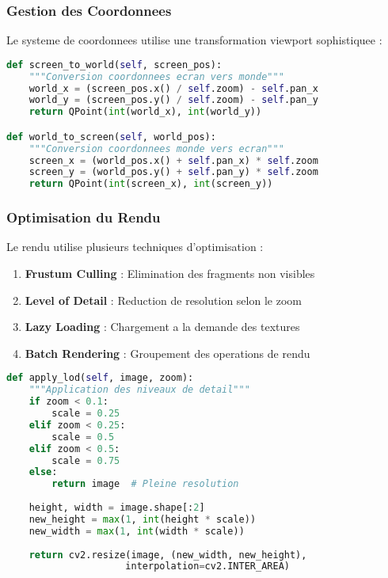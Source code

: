 \documentclass[12pt,a4paper]{article}
\begin{document}
\subsubsection{Gestion des Coordonnees}

Le systeme de coordonnees utilise une transformation viewport sophistiquee :

\begin{lstlisting}[language=Python]
def screen_to_world(self, screen_pos):
    """Conversion coordonnees ecran vers monde"""
    world_x = (screen_pos.x() / self.zoom) - self.pan_x
    world_y = (screen_pos.y() / self.zoom) - self.pan_y
    return QPoint(int(world_x), int(world_y))

def world_to_screen(self, world_pos):
    """Conversion coordonnees monde vers ecran"""
    screen_x = (world_pos.x() + self.pan_x) * self.zoom
    screen_y = (world_pos.y() + self.pan_y) * self.zoom
    return QPoint(int(screen_x), int(screen_y))
\end{lstlisting}

\subsubsection{Optimisation du Rendu}

Le rendu utilise plusieurs techniques d'optimisation :

\begin{enumerate}
\item \textbf{Frustum Culling} : Elimination des fragments non visibles
\item \textbf{Level of Detail} : Reduction de resolution selon le zoom
\item \textbf{Lazy Loading} : Chargement a la demande des textures
\item \textbf{Batch Rendering} : Groupement des operations de rendu
\end{enumerate}

\begin{lstlisting}[language=Python]
def apply_lod(self, image, zoom):
    """Application des niveaux de detail"""
    if zoom < 0.1:
        scale = 0.25
    elif zoom < 0.25:
        scale = 0.5
    elif zoom < 0.5:
        scale = 0.75
    else:
        return image  # Pleine resolution
    
    height, width = image.shape[:2]
    new_height = max(1, int(height * scale))
    new_width = max(1, int(width * scale))
    
    return cv2.resize(image, (new_width, new_height), 
                     interpolation=cv2.INTER_AREA)
\end{lstlisting}
\end{document}
